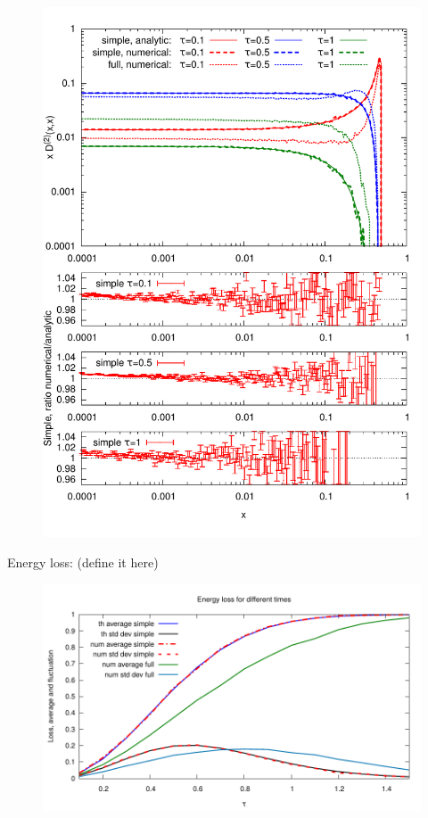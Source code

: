 \documentclass[pstricks,mathserif]{beamer}
\begin{document}
\begin{frame}
\begin{figure}
\includegraphics[width=1\linewidth]{D2.pdf}
\endminipage\hfill
\end{figure}


\end{frame}



\begin{frame}
Energy loss: (define it here)
\begin{figure}
\centering
\includegraphics[width=1\linewidth]{energyloss.pdf}
\end{figure}

\end{frame}
\end{document}

